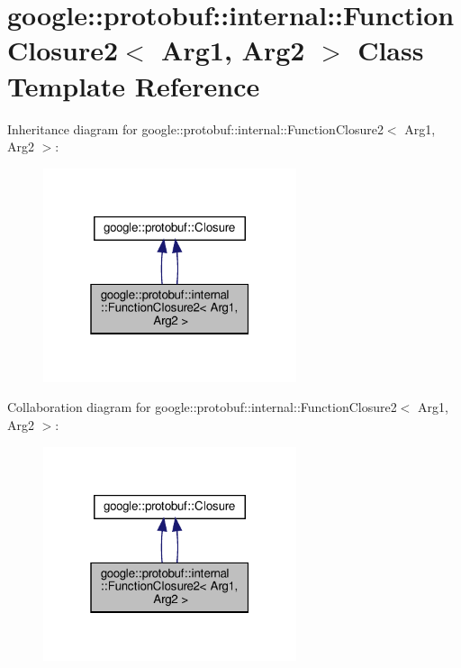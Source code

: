 \hypertarget{classgoogle_1_1protobuf_1_1internal_1_1FunctionClosure2}{}\section{google\+:\+:protobuf\+:\+:internal\+:\+:Function\+Closure2$<$ Arg1, Arg2 $>$ Class Template Reference}
\label{classgoogle_1_1protobuf_1_1internal_1_1FunctionClosure2}


Inheritance diagram for google\+:\+:protobuf\+:\+:internal\+:\+:Function\+Closure2$<$ Arg1, Arg2 $>$\+:
\nopagebreak
\begin{figure}[H]
\begin{center}
\leavevmode
\includegraphics[width=211pt]{classgoogle_1_1protobuf_1_1internal_1_1FunctionClosure2__inherit__graph}
\end{center}
\end{figure}


Collaboration diagram for google\+:\+:protobuf\+:\+:internal\+:\+:Function\+Closure2$<$ Arg1, Arg2 $>$\+:
\nopagebreak
\begin{figure}[H]
\begin{center}
\leavevmode
\includegraphics[width=211pt]{classgoogle_1_1protobuf_1_1internal_1_1FunctionClosure2__coll__graph}
\end{center}
\end{figure}
